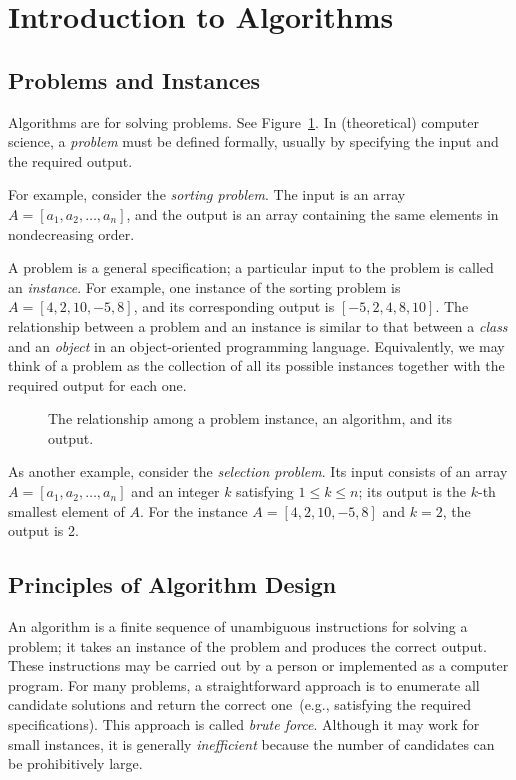 \setcounter{definition}{0} \setcounter{property}{0} \setcounter{claim}{0} \setcounter{fact}{0} \setcounter{corollary}{0} \setcounter{figure}{0}
\section{Introduction to Algorithms}

\subsection*{Problems and Instances}

Algorithms are for solving problems.
See Figure~\ref{fig:problem-algorithm}.
In (theoretical) computer science, a \emph{problem} must be
defined formally, usually by specifying the input and the required
output.

For example, consider the \emph{sorting problem}. The input is an array
$A=[a_1,a_2,\ldots,a_n]$, and the output is an array containing the same
elements in nondecreasing order.

A problem is a general specification; a particular input to the problem is
called an \emph{instance}. For example, one instance of the sorting problem is
$A=[4,2,10,-5,8]$, and its corresponding output is
$[-5,2,4,8,10]$. The
relationship between a problem and an instance is similar to that between a
\emph{class} and an \emph{object} in an object-oriented programming language.
Equivalently, we may think of a problem as the collection of all its possible
instances together with the required output for each one.

\begin{figure}[h]
\centering{}
\caption{The relationship among a problem instance, an algorithm, and its output.}
\label{fig:problem-algorithm}
\end{figure}


As another example, consider the \emph{selection problem}. Its input consists
of an array $A=[a_1,a_2,\ldots,a_n]$ and an integer $k$ satisfying
$1\le k\le n$; its output is the $k$-th smallest element of $A$. For the
instance $A=[4,2,10,-5,8]$ and $k=2$, the output is 2.

\subsection*{Principles of Algorithm Design}

An algorithm is a finite sequence of unambiguous instructions for solving a
problem; it takes an instance of the problem and produces the correct output.
These instructions may be carried out by a person or implemented
as a computer program. For many problems, a straightforward approach is to
enumerate all candidate solutions and return the correct one~(e.g., satisfying the required
specifications). This approach is called \emph{brute force}. Although it may work
for small instances, it is generally \emph{inefficient} because the number of
candidates can be prohibitively large.

